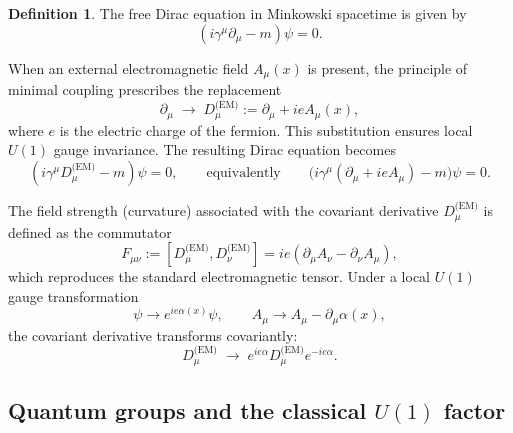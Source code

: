 \documentclass[12pt,a4paper]{article}
\theoremstyle{plain}
\theoremstyle{definition}
\newtheorem{definition}[theorem]{Definition}
\begin{document}
\begin{definition}
The free Dirac equation in Minkowski spacetime is given by
\begin{equation}
(i\gamma^\mu\partial_\mu - m)\psi = 0. \label{eq:free_dirac}
\end{equation}

When an external electromagnetic field \(A_\mu(x)\) is present, the principle of minimal coupling prescribes the replacement \cite{Nakahara2003, Kane2017}
\begin{equation}
\partial_\mu \;\longrightarrow\; D_\mu^{\text{(EM)}} := \partial_\mu + ieA_\mu(x), \label{eq:minimal_coupling}
\end{equation}
where \(e\) is the electric charge of the fermion. This substitution ensures local \(U(1)\) gauge invariance. The resulting Dirac equation becomes
\begin{equation}
(i\gamma^\mu D_\mu^{\text{(EM)}} - m)\psi = 0, \qquad\text{equivalently}\qquad \bigl(i\gamma^\mu(\partial_\mu + ieA_\mu) - m\bigr)\psi = 0. \label{eq:dirac_em}
\end{equation}

The field strength (curvature) associated with the covariant derivative \(D_\mu^{\text{(EM)}}\) is defined as the commutator 
\begin{equation}
F_{\mu\nu} := [D_\mu^{\text{(EM)}}, D_\nu^{\text{(EM)}}] = ie(\partial_\mu A_\nu - \partial_\nu A_\mu), \label{eq:field_strength_std}
\end{equation}
which reproduces the standard electromagnetic tensor. Under a local \(U(1)\) gauge transformation \cite{Nakahara2003, Hu2024, Cacic2023}
\begin{equation}
\psi \to e^{ie\alpha(x)}\psi, \qquad A_\mu \to A_\mu - \partial_\mu\alpha(x), \label{eq:gauge_transform_std}
\end{equation}
the covariant derivative transforms covariantly:
\begin{equation}
D_\mu^{\text{(EM)}} \;\longrightarrow\; e^{ie\alpha} D_\mu^{\text{(EM)}} e^{-ie\alpha}. \label{eq:covariant_transform_std}
\end{equation}
\end{definition}
\subsection{Quantum groups and the classical \(U(1)\) factor}
\end{document}
